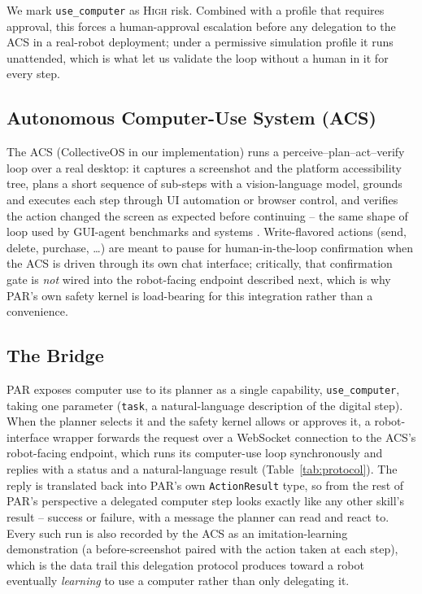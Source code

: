 \documentclass{article}
\begin{document}
We mark \texttt{use\_computer} as \textsc{High} risk. Combined with a
profile that requires approval, this forces a human-approval escalation
before any delegation to the ACS in a real-robot deployment; under a
permissive simulation profile it runs unattended, which is what let us
validate the loop without a human in it for every step.

\subsection{Autonomous Computer-Use System (ACS)}
The ACS (CollectiveOS in our implementation) runs a perceive--plan--act--verify
loop over a real desktop: it captures a screenshot and the platform
accessibility tree, plans a short sequence of sub-steps with a
vision-language model, grounds and executes each step through UI
automation or browser control, and verifies the action changed the screen
as expected before continuing -- the same shape of loop used by GUI-agent
benchmarks and systems \citep{zhou2023webarena,deng2023mind2web,hong2023cogagent,anthropic2024computeruse}.
Write-flavored actions (send, delete, purchase, \ldots) are meant to pause
for human-in-the-loop confirmation when the ACS is driven through its own
chat interface; critically, that confirmation gate is \emph{not} wired
into the robot-facing endpoint described next, which is why PAR's own
safety kernel is load-bearing for this integration rather than a
convenience.

\subsection{The Bridge}
PAR exposes computer use to its planner as a single capability,
\texttt{use\_computer}, taking one parameter (\texttt{task}, a natural-language
description of the digital step). When the planner selects it and the
safety kernel allows or approves it, a robot-interface wrapper forwards the
request over a WebSocket connection to the ACS's robot-facing endpoint,
which runs its computer-use loop synchronously and replies with a status
and a natural-language result (Table~\ref{tab:protocol}). The reply is
translated back into PAR's own \texttt{ActionResult} type, so from the rest
of PAR's perspective a delegated computer step looks exactly like any other
skill's result -- success or failure, with a message the planner can read
and react to. Every such run is also recorded by the ACS as an
imitation-learning demonstration (a before-screenshot paired with the
action taken at each step), which is the data trail this delegation
protocol produces toward a robot eventually \emph{learning} to use a
computer rather than only delegating it.
\end{document}

